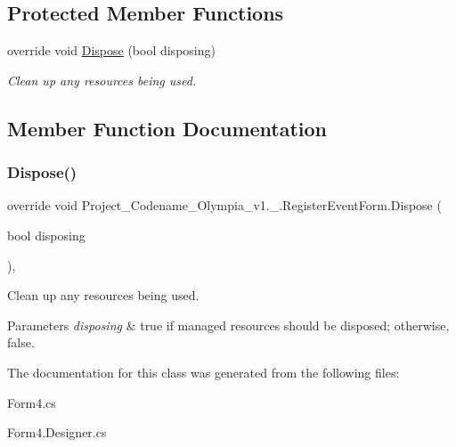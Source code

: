 \subsection*{Protected Member Functions}
\begin{DoxyCompactItemize}
\item 
override void \hyperlink{classProject__Codename__Olympia__v1_1_1__0_1_1RegisterEventForm_a36314720f560074be6a7a2fa7bde5cbe}{Dispose} (bool disposing)
\begin{DoxyCompactList}\small\item\em Clean up any resources being used. \end{DoxyCompactList}\end{DoxyCompactItemize}


\subsection{Member Function Documentation}
\mbox{\label{classProject__Codename__Olympia__v1_1_1__0_1_1RegisterEventForm_a36314720f560074be6a7a2fa7bde5cbe}} 
\subsubsection{\texorpdfstring{Dispose()}{Dispose()}}
{\footnotesize\ttfamily override void Project\+\_\+\+Codename\+\_\+\+Olympia\+\_\+v1.\+\_.\+Register\+Event\+Form.\+Dispose (\begin{DoxyParamCaption}\item[{bool}]{disposing }\end{DoxyParamCaption})\hspace{0.3cm}{\ttfamily [inline]}, {\ttfamily [protected]}}



Clean up any resources being used. 


\begin{DoxyParams}{Parameters}
{\em disposing} & true if managed resources should be disposed; otherwise, false.\\
\hline
\end{DoxyParams}


The documentation for this class was generated from the following files\+:\begin{DoxyCompactItemize}
\item 
Form4.\+cs\item 
Form4.\+Designer.\+cs\end{DoxyCompactItemize}

